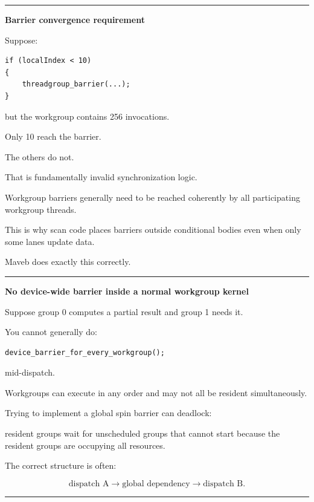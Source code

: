\begin{center}\rule{0.5\linewidth}{0.5pt}\end{center}

\textbf{Barrier convergence requirement}

Suppose:

\protect{}\label{sp9bsz}%
\begin{verbatim}
if (localIndex < 10)
{
    threadgroup_barrier(...);
}
\end{verbatim}

but the workgroup contains 256 invocations.

Only 10 reach the barrier.

The others do not.

That is fundamentally invalid synchronization logic.

Workgroup barriers generally need to be reached coherently by all participating workgroup threads.

This is why scan code places barriers outside conditional bodies even when only some lanes update data.

Maveb does exactly this correctly.

\begin{center}\rule{0.5\linewidth}{0.5pt}\end{center}

\textbf{No device-wide barrier inside a normal workgroup kernel}

Suppose group 0 computes a partial result and group 1 needs it.

You cannot generally do:

\protect{}\label{o1fakh}%
\begin{verbatim}
device_barrier_for_every_workgroup();
\end{verbatim}

mid-dispatch.

Workgroups can execute in any order and may not all be resident simultaneously.

Trying to implement a global spin barrier can deadlock:

resident groups wait for unscheduled groups that cannot start because the resident groups are occupying all resources.

The correct structure is often:

\[
\boxed{
\text{dispatch A}
\rightarrow
\text{global dependency}
\rightarrow
\text{dispatch B}.
}
\]

\begin{center}\rule{0.5\linewidth}{0.5pt}\end{center}

